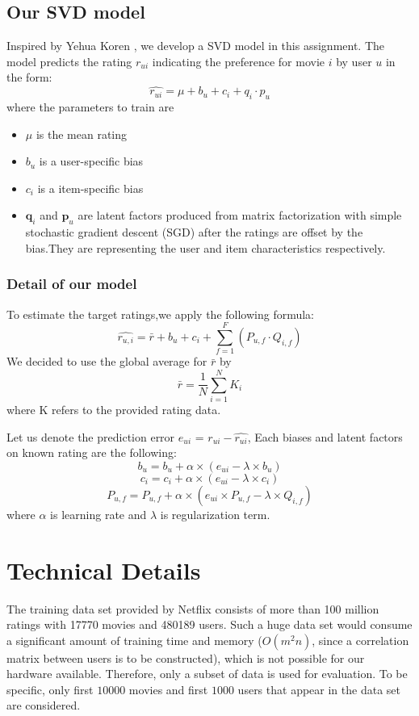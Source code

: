 \documentclass[final]{cvpr}
\begin{document}
\subsection{Our SVD model}
Inspired by Yehua Koren \cite{FactorMeet}, we develop a SVD model in this assignment. The model predicts the rating $r_{ui}$ indicating the preference for movie $i$ by user $u$ in the form:
$$\hat{r_{ui}} = \mu + b_u + c_i + q_i \cdot p_u$$
where the parameters to train are \begin{itemize}
	\item $\mu$ is the mean rating
	\item $b_u$ is a user-specific bias 
	\item $c_i$ is a item-specific bias 
	\item $\mathbf q_i$ and $\mathbf p_u$ are latent factors
		produced from matrix factorization with simple stochastic gradient descent (SGD)
		after the ratings are offset by the bias.They are representing the user and item characteristics respectively.
\end{itemize}


\subsubsection{Detail of our model}

To estimate the target ratings,we apply the following formula:
$$ \hat{r_{u,i}} = \bar{r}+b_u + c_i + \sum_{f=1}^F (P_{u,f} \cdot Q_{i,f}) $$
We decided to use the global average for $\bar{r}$ by
$$\bar{r} = \frac{1}{N} \sum^{N}_{i=1} K_i$$
where K refers to the provided rating data.

Let us denote the prediction error $e_{ui}$ = $r_{ui} - \hat{r_{ui}}$,
Each biases and latent factors on known rating are the following:
$$ b_u = b_u + \alpha \times (e_{ui} - \lambda \times b_u)$$
$$ c_i = c_i + \alpha \times (e_{ui} - \lambda \times c_i)$$
$$ P_{u,f} = P_{u,f} +  \alpha \times (e_{ui} \times P_{u,f} - \lambda \times Q_{i,f})$$
where $\alpha$ is learning rate and $\lambda$ is regularization term.

\section{Technical Details}
The training data set provided by Netflix consists of more than 100 million ratings with 17770 movies and 480189 users.
Such a huge data set would consume a significant amount of training time and memory
($O(m^2 n)$, since a correlation matrix between users is to be constructed),
which is not possible for our hardware available.
Therefore, only a subset of data is used for evaluation.
To be specific, only first $10000$ movies and first $1000$ users that appear in the data set are considered.
\end{document}
